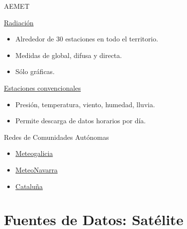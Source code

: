 \documentclass[xcolor={usenames,svgnames,dvipsnames}]{beamer}
\begin{document}
\begin{frame}[label=sec-4-6]{AEMET}
\begin{block}{\href{http://www.aemet.es/es/eltiempo/observacion/radiacion}{Radiación}}
\begin{itemize}
\item Alrededor de 30 estaciones en todo el territorio.
\item Medidas de global, difusa y directa.
\item Sólo gráficas.
\end{itemize}
\end{block}
\begin{block}{\href{http://www.aemet.es/es/eltiempo/observacion/ultimosdatos}{Estaciones \guillemotleft{}convencionales\guillemotright{}}}
\begin{itemize}
\item Presión, temperatura, viento, humedad, lluvia.
\item Permite descarga de datos horarios por día.
\end{itemize}
\end{block}
\end{frame}
\begin{frame}[label=sec-4-7]{Redes de Comunidades Autónomas}
\begin{itemize}
\item \href{http://www2.meteogalicia.es/galego/observacion/estacions/estacions.asp}{Meteogalicia}
\item \href{http://meteo.navarra.es/estaciones/mapadeestaciones.cfm}{MeteoNavarra}
\item \href{http://www.meteo.cat/xema/AppJava/SeleccioPerComarca.do}{Cataluña}
\end{itemize}
\end{frame}
\section{Fuentes de Datos: Satélite}
\label{sec-5}
\end{document}

